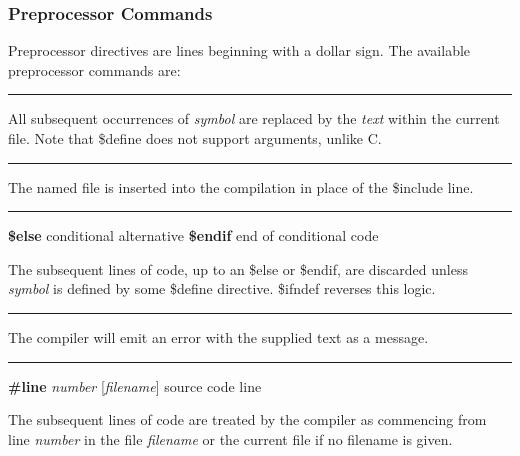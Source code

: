 \subsubsection{Preprocessor Commands}

Preprocessor directives are lines beginning with a dollar sign. The
available preprocessor commands are:

\bigskip\hrule\vspace{0.1cm}

\noindent
{}All subsequent occurrences of \textit{symbol} are
replaced by the \textit{text} within the current file. Note that
\$define does not support arguments, unlike C.

\bigskip\hrule\vspace{0.1cm}

\noindent
{}The named file is inserted into the compilation in place
of the \$include line.

\bigskip\hrule\vspace{0.1cm}

\noindent{}
\linebreak
{\textbf{\$else} \hfill conditional alternative}
\linebreak
{\textbf{\$endif} \hfill end of conditional code}

The subsequent lines of code, up to an \$else or \$endif, are discarded
unless \textit{symbol} is defined by some \$define directive. \$ifndef
reverses this logic.

\bigskip\hrule\vspace{0.1cm}

\noindent
{}The compiler will emit an error with the
supplied text as a message.


\bigskip\hrule\vspace{0.1cm}
{\textbf{\#line} \textit{number}
[\textit{filename}] \hfill source code line}

\noindent
The subsequent lines of code are treated by the compiler as commencing
from line \textit{number} in the file \textit{filename} or the current
file if no filename is given.

